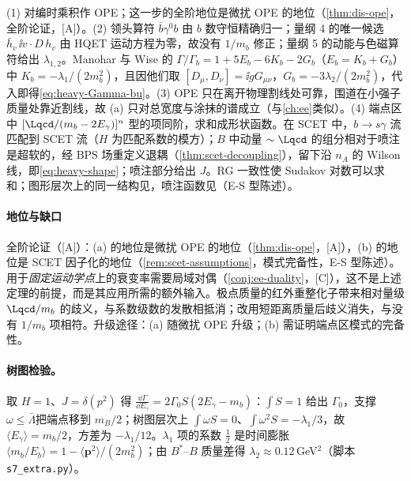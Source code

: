 \begin{proofsketch}
(1) 对编时乘积作 OPE；这一步的全阶地位是微扰 OPE 的地位（\cref{thm:dis-ope}，全阶论证，[A]）。(2) 领头算符 $\bar b\gamma^0b$ 由 $b$ 数守恒精确归一；量纲 4 的唯一候选 $\bar h_v\,\ii v\cdot D\,h_v$ 由 HQET 运动方程为零，故没有 $1/m_b$ 修正\cite{ChayGeorgiGrinstein1990,BigiUraltsevVainshtein1992}；量纲 5 的动能与色磁算符给出 $\lambda_{1,2}$。Manohar 与 Wise 的 $\Gamma/\Gamma_b=1+5E_b-6K_b-2G_b$（$E_b=K_b+G_b$）\cite[式~(5.7)，$\rho\to0$]{ManoharWise1994}中 $K_b=-\lambda_1/(2m_b^2)$，且因他们取 $[D_\mu,D_\nu]=\ii gG_{\mu\nu}$，$G_b=-3\lambda_2/(2m_b^2)$，代入即得\cref{eq:heavy-Gamma-bu}。(3) OPE 只在离开物理割线处可靠，围道在小强子质量处靠近割线，故 (a) 只对总宽度与涂抹的谱成立（与\cref{ch:ee}类似）。(4) 端点区中 $[\Lqcd/(m_b-2E_\gamma)]^n$ 型的项同阶，求和成形状函数\cite{Neubert1994a,Neubert1994b,BigiEtAl1994}。在 SCET 中，$b\to s\gamma$ 流匹配到 SCET 流（$H$ 为匹配系数的模方）；$B$ 中动量 $\sim\Lqcd$ 的组分相对于喷注是超软的，经 BPS 场重定义退耦（\cref{thm:scet-decoupling}），留下沿 $n_A$ 的 Wilson 线，即\cref{eq:heavy-shape}；喷注部分给出 $J$。RG 一致性使 Sudakov 对数可以求和\cite{BauerFlemingLuke2000}；图形层次上的同一结构见\cite{KorchemskySterman1994}，喷注函数见\cite{Bauer:2003pi,Becher:2006qw}（E-S 型陈述）。
\end{proofsketch}

\paragraph{地位与缺口}
全阶论证（[A]）：(a) 的地位是微扰 OPE 的地位（\cref{thm:dis-ope}，[A]），(b) 的地位是 SCET 因子化的地位（\cref{rem:scet-assumptions}，模式完备性，E-S 型陈述）。用于\emph{固定运动学点}上的衰变率需要局域对偶（\cref{conj:ee-duality}，[C]），这不是上述定理的前提，而是其应用所需的额外输入。极点质量的红外重整化子带来相对量级 $\Lqcd/m_b$ 的歧义，与系数级数的发散相抵消；改用短距离质量后歧义消失，与没有 $1/m_b$ 项相符\cite{Bigi:1994em,Beneke:1994sw}。升级途径：(a) 随微扰 OPE 升级；(b) 需证明端点区模式的完备性。

\paragraph{树图检验。}
取 $H=1$、$J=\delta(p^2)$ 得 $\frac{\dd\Gamma}{\dd E_\gamma}=2\Gamma_0S(2E_\gamma-m_b)$：$\int S=1$ 给出 $\Gamma_0$，支撑 $\omega\le\bar\Lambda$\cite{Neubert1994b}把端点移到 $m_B/2$；树图层次上 $\int\omega S=0$、$\int\omega^2S=-\lambda_1/3$，故 $\langle E_\gamma\rangle=m_b/2$，方差为 $-\lambda_1/12$。$\lambda_1$ 项的系数 $\frac12$ 是时间膨胀 $\langle m_b/E_b\rangle=1-\langle\bm p^2\rangle/(2m_b^2)$；由 $B^*$--$B$ 质量差\cite{ParticleDataGroup:2024cfk}得 $\lambda_2\approx0.12$\,GeV$^2$（脚本 \texttt{s7\_\allowbreak extra.py}）。

